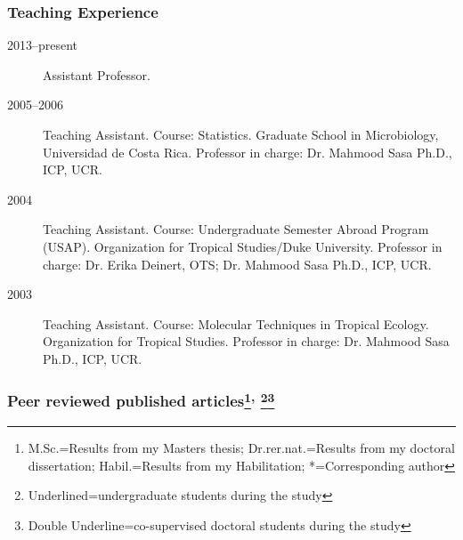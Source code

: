 \documentclass[letter,10pt]{article}
\begin{document}
\subsubsection*{Teaching Experience}
\begin{description}
\item[2013--present] Assistant Professor.

\item[2005--2006] Teaching Assistant. Course: Statistics. Graduate School in Microbiology, Universidad de Costa Rica. Professor in charge: Dr. Mahmood Sasa Ph.D., ICP, UCR.

\item[2004] Teaching Assistant. Course: Undergraduate Semester Abroad Program (USAP). Organization for Tropical Studies/Duke University. Professor in charge: Dr. Erika Deinert, OTS; Dr. Mahmood Sasa Ph.D., ICP, UCR.

\item[2003] Teaching Assistant. Course: Molecular Techniques in Tropical Ecology. Organization for Tropical Studies. Professor in charge: Dr. Mahmood Sasa Ph.D., ICP, UCR.
\end{description}

\subsubsection*{Peer reviewed published articles\footnote{M.Sc.=Results from my Masters thesis; Dr.rer.nat.=Results from my doctoral dissertation; Habil.=Results from my Habilitation; *=Corresponding author}\textsuperscript{,} \footnote{Underlined=undergraduate students during the study}\footnote{Double Underline=co-supervised doctoral students during the study}}%
\end{document}
